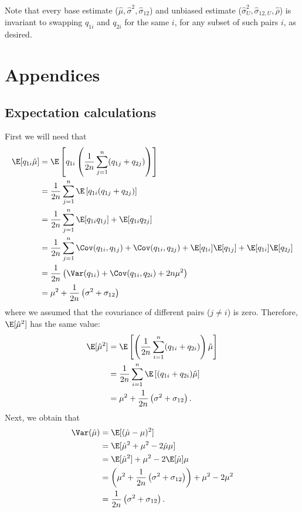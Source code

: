 \documentclass[11pt]{article}
\begin{document}
Note that every base estimate ($\hat{\mu}, \hat{\sigma}^2, \hat{\sigma}_{12}$) and unbiased estimate ($\hat{\sigma}^2_U, \hat{\sigma}_{12,U},\hat{\rho}$) is invariant to swapping $q_{1i}$ and $q_{2i}$ for the same $i$, for any subset of such pairs $i$, as desired.

\section{Appendices}

\subsection{Expectation calculations}

\label{sec:expectations}

First we will need that
\begin{align*}
  \E[ q_{1i} \hat{\mu} ]
  &=
    \E\left[ q_{1i} \left( \frac{1}{2n} \sum_{j=1}^n ( q_{1j} + q_{2j} ) \right) \right]
  \\
  &=
    \frac{1}{2n} \sum_{j=1}^n \E\left[ q_{1i} ( q_{1j} + q_{2j} ) \right]
  \\
  &=
    \frac{1}{2n} \sum_{j=1}^n \E[ q_{1i} q_{1j} ] + \E[ q_{1i} q_{2j} ]
  \\
  &=
    \frac{1}{2n} \sum_{j=1}^n \Cov( q_{1i}, q_{1j} ) + \Cov( q_{1i}, q_{2j} ) + \E[ q_{1i}] \E[q_{1j} ] + \E[ q_{1i}] \E[q_{2j} ]
  \\
  &=
    \frac{1}{2n} \left( \Var( q_{1i}) + \Cov( q_{1i}, q_{2i} ) + 2 n \mu^2 \right)
  \\
  &=
    \mu^2 + \frac{1}{2n} \left( \sigma^2 + \sigma_{12} \right)
\end{align*}
where we assumed that the covariance of different pairs ($j \ne i$) is zero.
Therefore, $\E[ \hat{\mu}^2 ]$ has the same value:
\begin{align*}
  \E[ \hat{\mu}^2 ]
  &=
    \E\left[ \left( \frac{1}{2n} \sum_{i=1}^n ( q_{1i} + q_{2i} ) \right) \hat{\mu} \right]
  \\
  &=
    \frac{1}{2n} \sum_{i=1}^n \E\left[ ( q_{1i} + q_{2i} ) \hat{\mu} \right]
  \\
  &=
    \mu^2 + \frac{1}{2n} \left( \sigma^2 + \sigma_{12} \right)
  .
\end{align*}
Next, we obtain that
\begin{align*}
  \Var( \hat{\mu} )
  &=
    \E[ (\hat{\mu} - \mu)^2 ]
  \\
  &=
    \E[ \hat{\mu}^2 + \mu^2 - 2 \hat{\mu}\mu ]
  \\
  &=
    \E[ \hat{\mu}^2 ] + \mu^2 - 2 \E[ \hat{\mu} ] \mu
  \\
  &=
    \left(
    \mu^2
    +
    \frac{1}{2n} \left(
    \sigma^2
    + \sigma_{12}
    \right)
    \right)
    + \mu^2 - 2 \mu^2
  \\
  &=
    \frac{1}{2n} \left(
    \sigma^2
    + \sigma_{12}
    \right)
    .
\end{align*}
\end{document}
